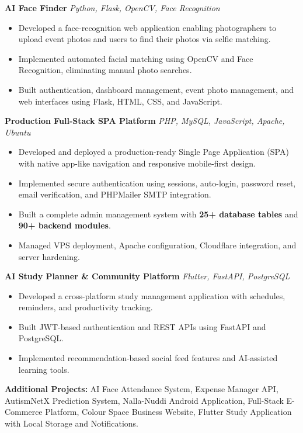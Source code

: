 \documentclass[10pt,a4paper]{article}
\begin{document}
\textbf{AI Face Finder}
\hfill \textit{Python, Flask, OpenCV, Face Recognition}

\begin{itemize}[leftmargin=*,itemsep=0pt,topsep=0pt]
\item Developed a face-recognition web application enabling photographers to upload event photos and users to find their photos via selfie matching.
\item Implemented automated facial matching using OpenCV and Face Recognition, eliminating manual photo searches.
\item Built authentication, dashboard management, event photo management, and web interfaces using Flask, HTML, CSS, and JavaScript.
\end{itemize}

\textbf{Production Full-Stack SPA Platform}
\hfill \textit{PHP, MySQL, JavaScript, Apache, Ubuntu}

\begin{itemize}[leftmargin=*,itemsep=0pt,topsep=0pt]
\item Developed and deployed a production-ready Single Page Application (SPA) with native app-like navigation and responsive mobile-first design.
\item Implemented secure authentication using sessions, auto-login, password reset, email verification, and PHPMailer SMTP integration.
\item Built a complete admin management system with \textbf{25+ database tables} and \textbf{90+ backend modules}.
\item Managed VPS deployment, Apache configuration, Cloudflare integration, and server hardening.
\end{itemize}

\textbf{AI Study Planner \& Community Platform}
\hfill \textit{Flutter, FastAPI, PostgreSQL}

\begin{itemize}[leftmargin=*,itemsep=0pt,topsep=0pt]
\item Developed a cross-platform study management application with schedules, reminders, and productivity tracking.
\item Built JWT-based authentication and REST APIs using FastAPI and PostgreSQL.
\item Implemented recommendation-based social feed features and AI-assisted learning tools.
\end{itemize}

\textbf{Additional Projects:}
AI Face Attendance System, Expense Manager API, AutismNetX Prediction System, Nalla-Nuddi Android Application, Full-Stack E-Commerce Platform, Colour Space Business Website, Flutter Study Application with Local Storage and Notifications.
\end{document}

